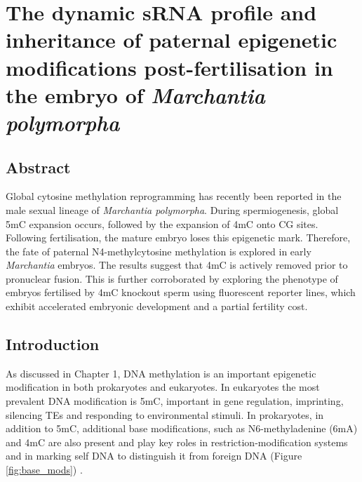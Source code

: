 \chapter{The dynamic sRNA profile and inheritance of paternal epigenetic modifications post-fertilisation in the embryo of \textit{Marchantia polymorpha}}

\ifpdf
    \graphicspath{{Chapter3/Figs/Raster/}{Chapter3/Figs/PDF/}{Chapter3/Figs/}}
\else
    \graphicspath{{Chapter3/Figs/Vector/}{Chapter3/Figs/}}
\fi


\section{Abstract}

Global cytosine methylation reprogramming has recently been reported in the male sexual lineage of \textit{Marchantia polymorpha}. During spermiogenesis, global 5mC expansion occurs, followed by the expansion of 4mC onto CG sites. Following fertilisation, the mature embryo loses this epigenetic mark. Therefore, the fate of paternal N4-methylcytosine methylation is explored in early \textit{Marchantia} embryos. The results suggest that 4mC is actively removed prior to pronuclear fusion. This is further corroborated by exploring the phenotype of embryos fertilised by 4mC knockout sperm using fluorescent reporter lines, which exhibit accelerated embryonic development and a partial fertility cost.


\section{Introduction}

As discussed in Chapter 1, DNA methylation is an important epigenetic modification in both prokaryotes and eukaryotes. In eukaryotes the most prevalent DNA modification is 5mC, important in gene regulation, imprinting, silencing TEs and responding to environmental stimuli. In prokaryotes, in addition to 5mC, additional base modifications, such as N6-methyladenine (6mA) and 4mC are also present and play key roles in restriction-modification systems and in marking self DNA to distinguish it from foreign DNA (Figure \ref{fig:base_mods}) \cite{RN309}.

